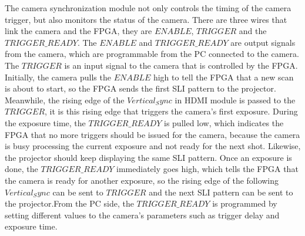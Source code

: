 \documentclass[]{spie}  %
\begin{document}
The camera synchronization module not only controls the timing of the camera trigger, but also monitors the status of the camera. There are three wires that link the camera and the FPGA, they are $ENABLE$, $TRIGGER$ and the $TRIGGER\_READY$. The $ENABLE$ and $TRIGGER\_READY$ are output signals from the camera, which are programmable from the PC connected to the camera. The $TRIGGER$ is an input signal to the camera that is controlled by the FPGA. Initially, the camera pulls the $ENABLE$ high to tell the FPGA that a new scan is about to start, so the FPGA sends the first SLI pattern to the projector. Meanwhile, the rising edge of the $Vertical_Sync$ in HDMI module is passed to the $TRIGGER$, it is this rising edge that triggers the camera's first exposure. During the exposure time, the $TRIGGER\_READY$ is pulled low, which indicates the FPGA that no more triggers should be issued for the camera, because the camera is busy processing the current exposure and not ready for the next shot. Likewise, the projector should keep displaying the same SLI pattern. Once an exposure is done, the $TRIGGER\_READY$ immediately goes high,  which tells the FPGA that the camera is ready for another exposure, so the rising edge of the following $Vertical_Sync$ can be sent to $TRIGGER$ and the next SLI pattern can be sent to the projector.From the PC side, the $TRIGGER\_READY$ is programmed by setting different values to the camera's parameters such as trigger delay and exposure time.
\end{document}
